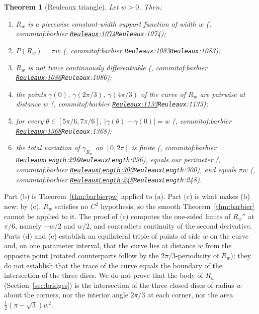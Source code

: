 \documentclass[11pt]{article}
\newtheorem{theorem}{Theorem}
\theoremstyle{definition}
\theoremstyle{remark}
\newcommand{\commitof}[1]{\csname commitof:#1\endcsname}
\newcommand{\repo}[1]{https://github.com/jpbald93/#1}
\newcommand{\src}[4]{\ifcsname commitof:#1\endcsname
  \href{\repo{#1}/blob/\commitof{#1}/#2/#3.lean\#L#4}{\texttt{#3}:#4}\else\texttt{#3}:#4\fi}
\begin{document}
\begin{theorem}[Reuleaux triangle]\label{thm:reuleaux}
Let $w>0$. Then:
\begin{enumerate}
\item[(a)] $R_w$ is a piecewise constant-width support function of width $w$
(, \src{barbier}{Barbier}{Reuleaux}{1074});
\item[(b)] $P(R_w) = \pi w$ (, \src{barbier}{Barbier}{Reuleaux}{1083});
\item[(c)] $R_w$ is not twice continuously differentiable (, \src{barbier}{Barbier}{Reuleaux}{1086});
\item[(d)] the points $\gamma(0)$, $\gamma(2\pi/3)$, $\gamma(4\pi/3)$ of the curve of $R_w$ are pairwise
at distance $w$ (, \src{barbier}{Barbier}{Reuleaux}{1133});
\item[(e)] for every $\theta\in[5\pi/6, 7\pi/6]$, $\lvert\gamma(\theta)-\gamma(0)\rvert = w$
(, \src{barbier}{Barbier}{Reuleaux}{1368});
\item[(f)] the total variation of $\gamma_{R_w}$ on $[0,2\pi]$ is finite
(, \src{barbier}{Barbier}{ReuleauxLength}{296}), equals our
perimeter (, \src{barbier}{Barbier}{ReuleauxLength}{300}),
and equals $\pi w$ (, \src{barbier}{Barbier}{ReuleauxLength}{248}).
\end{enumerate}
\end{theorem}

Part (b) is Theorem~\ref{thm:barbierpw} applied to (a). Part (c) is what makes (b) new: by (c), $R_w$
satisfies no $C^2$ hypothesis, so the smooth Theorem~\ref{thm:barbier} cannot be applied to it. The
proof of (c) computes the one-sided limits of $R_w''$ at $\pi/6$, namely $-w/2$ and $w/2$, and
contradicts continuity of the second derivative. Parts (d) and (e) establish an equilateral triple
of points of side $w$ on the curve and, on one parameter interval, that the curve lies at distance $w$
from the opposite point (rotated counterparts follow by the $2\pi/3$-periodicity of $R_w$); they do not
establish that the trace of the curve equals the boundary of the intersection of the three discs.
We do not prove that the body of $R_w$ (Section~\ref{sec:bridges}) is the intersection of the three
closed discs of radius $w$ about the corners, nor the interior angle $2\pi/3$ at each corner, nor the
area $\tfrac12(\pi-\sqrt3)w^2$.
\end{document}
